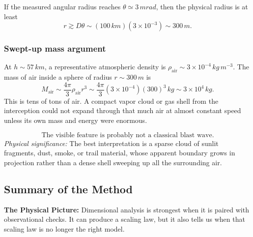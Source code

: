 If the measured angular radius reaches $\theta\simeq3\,\si{mrad}$, then the
physical radius is at least
\begin{equation}
    r\gtrsim D\theta
    \sim
    (100\,\si{km})(3\times10^{-3})
    \sim300\,\si{m}.
    \label{eq:lec05:rocket-physical-radius}
\end{equation}

\subsubsection*{Swept-up mass argument}
At $h\sim57\,\si{km}$, a representative atmospheric density is
$\rho_{\mathrm{air}}\sim3\times10^{-4}\,\si{kg\,m^{-3}}$. The mass of air
inside a sphere of radius $r\sim300\,\si{m}$ is
\begin{equation}
    M_{\mathrm{air}}
    \sim
    \frac{4\pi}{3}\rho_{\mathrm{air}}r^3
    \sim
    \frac{4\pi}{3}(3\times10^{-4})(300)^3\,\si{kg}
    \sim3\times10^4\,\si{kg}.
    \label{eq:lec05:swept-air-mass}
\end{equation}
This is tens of tons of air. A compact vapor cloud or gas shell from the
interception could not expand through that much air at almost constant speed
unless its own mass and energy were enormous.

\begin{equation}
    \boxed{
    \text{The visible feature is probably not a classical blast wave.}
    }
    \label{eq:lec05:not-classical-blast}
\end{equation}
\textit{Physical significance:} The best interpretation is a sparse cloud of
sunlit fragments, dust, smoke, or trail material, whose apparent boundary grows
in projection rather than a dense shell sweeping up all the surrounding air.

\subsection{Summary of the Method}
\label{sec:lec05:method-summary}

\textbf{The Physical Picture:}
Dimensional analysis is strongest when it is paired with observational checks.
It can produce a scaling law, but it also tells us when that scaling law is no
longer the right model.

